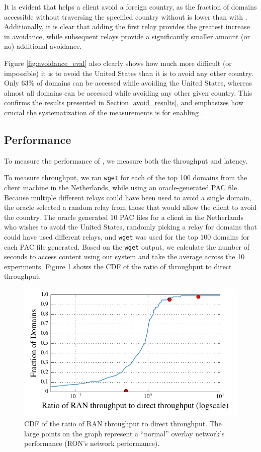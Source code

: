 It is evident that \system{} helps a client avoid a foreign country, as the 
fraction of domains accessible without traversing 
the specified country without \system{} is lower than with \system{}.  Additionally, 
it is clear that adding the first relay provides the greatest increase in 
avoidance, while subsequent relays provide a significantly 
smaller amount (or no) additional avoidance.

Figure \ref{fig:avoidance_eval} also clearly shows how much more difficult (or 
impossible) it is to avoid the United States than it is to avoid any other 
country.  Only 63\% of domains can be accessed while avoiding the United States, 
whereas almost all domains can be accessed while avoiding any other given 
country.  This confirms the results presented in Section \ref{avoid_results}, and 
emphasizes how crucial the systematization of the measurements is for enabling 
\system{}.

\subsection{Performance}
To measure the performance of \system{}, we measure both 
the throughput and latency.

To measure throughput, we ran {\tt wget} for each 
of the top 100 domains from the client machine in the Netherlands, while 
using an oracle-generated PAC file.  Because multiple different relays could have been 
used to avoid a single domain, the oracle selected a random relay from those 
that would allow the client to avoid the country.  The oracle generated 
10 PAC files for a client in the Netherlands who wishes to avoid the United States,
 randomly picking a relay for domains that could have used 
different relays, and {\tt wget} was used for the top 100 domains for each 
PAC file generated.  Based on the {\tt wget} output, we calculate the number 
of seconds to access content using our system and take the average across the 
10 experiments. Figure \ref{fig:throughput} shows 
the CDF of the ratio of \system{} throughput to direct throughput. 

\begin{figure}[t]
\centering
\includegraphics[width=.5\textwidth]{throughput}
\caption{CDF of the ratio of RAN throughput to direct throughput.  
The large points on the graph represent a ``normal'' overlay network's 
performance (RON's network performance).}
\label{fig:throughput}
\end{figure}

